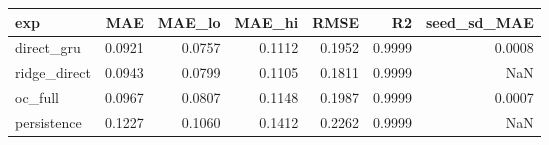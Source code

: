 \begin{tabular}{lrrrrrr}
\toprule
exp & MAE & MAE\_lo & MAE\_hi & RMSE & R2 & seed\_sd\_MAE \\
\midrule
direct\_gru & 0.0921 & 0.0757 & 0.1112 & 0.1952 & 0.9999 & 0.0008 \\
ridge\_direct & 0.0943 & 0.0799 & 0.1105 & 0.1811 & 0.9999 & NaN \\
oc\_full & 0.0967 & 0.0807 & 0.1148 & 0.1987 & 0.9999 & 0.0007 \\
persistence & 0.1227 & 0.1060 & 0.1412 & 0.2262 & 0.9999 & NaN \\
\bottomrule
\end{tabular}
